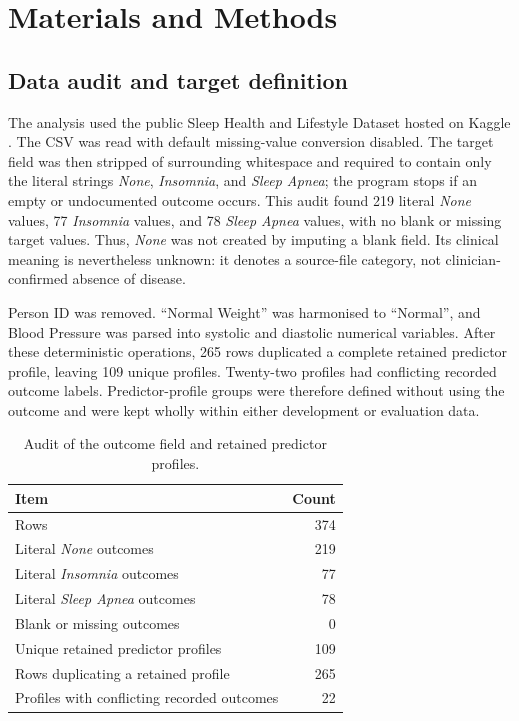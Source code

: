 \section{Materials and Methods}
\label{sec:methods-revision}

\subsection{Data audit and target definition}

The analysis used the public Sleep Health and Lifestyle Dataset hosted on Kaggle \cite{kaggle2023}. The CSV was read with default missing-value conversion disabled. The target field was then stripped of surrounding whitespace and required to contain only the literal strings \emph{None}, \emph{Insomnia}, and \emph{Sleep Apnea}; the program stops if an empty or undocumented outcome occurs. This audit found 219 literal \emph{None} values, 77 \emph{Insomnia} values, and 78 \emph{Sleep Apnea} values, with no blank or missing target values. Thus, \emph{None} was not created by imputing a blank field. Its clinical meaning is nevertheless unknown: it denotes a source-file category, not clinician-confirmed absence of disease.

Person ID was removed. ``Normal Weight'' was harmonised to ``Normal'', and Blood Pressure was parsed into systolic and diastolic numerical variables. After these deterministic operations, 265 rows duplicated a complete retained predictor profile, leaving 109 unique profiles. Twenty-two profiles had conflicting recorded outcome labels. Predictor-profile groups were therefore defined without using the outcome and were kept wholly within either development or evaluation data.

\begin{table}[width=\columnwidth,pos=!tbp]
\centering
\caption{Audit of the outcome field and retained predictor profiles.}
\label{tab:audit-revision}
\small
\begin{tabularx}{\columnwidth}{@{}Y r@{}}
\toprule
Item & Count \\
\midrule
Rows & 374 \\
Literal \emph{None} outcomes & 219 \\
Literal \emph{Insomnia} outcomes & 77 \\
Literal \emph{Sleep Apnea} outcomes & 78 \\
Blank or missing outcomes & 0 \\
Unique retained predictor profiles & 109 \\
Rows duplicating a retained profile & 265 \\
Profiles with conflicting recorded outcomes & 22 \\
\bottomrule
\end{tabularx}
\end{table}

